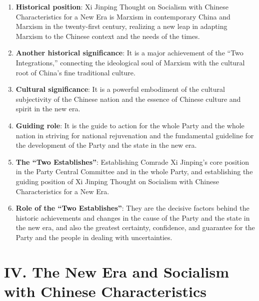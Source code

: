 \documentclass[11pt,a4paper]{ctexart}
\begin{document}
\begin{enumerate}[leftmargin=2em]
    \item \textbf{Historical position}: Xi Jinping Thought on Socialism with Chinese Characteristics for a New Era is Marxism in contemporary China and Marxism in the twenty-first century, realizing a new leap in adapting Marxism to the Chinese context and the needs of the times.
    \item \textbf{Another historical significance}: It is a major achievement of the ``Two Integrations,'' connecting the ideological soul of Marxism with the cultural root of China's fine traditional culture.
    \item \textbf{Cultural significance}: It is a powerful embodiment of the cultural subjectivity of the Chinese nation and the essence of Chinese culture and spirit in the new era.
    \item \textbf{Guiding role}: It is the guide to action for the whole Party and the whole nation in striving for national rejuvenation and the fundamental guideline for the development of the Party and the state in the new era.
    \item \textbf{The ``Two Establishes''}: Establishing Comrade Xi Jinping's core position in the Party Central Committee and in the whole Party, and establishing the guiding position of Xi Jinping Thought on Socialism with Chinese Characteristics for a New Era.
    \item \textbf{Role of the ``Two Establishes''}: They are the decisive factors behind the historic achievements and changes in the cause of the Party and the state in the new era, and also the greatest certainty, confidence, and guarantee for the Party and the people in dealing with uncertainties.
\end{enumerate}

\section{IV. The New Era and Socialism with Chinese Characteristics}
\end{document}

